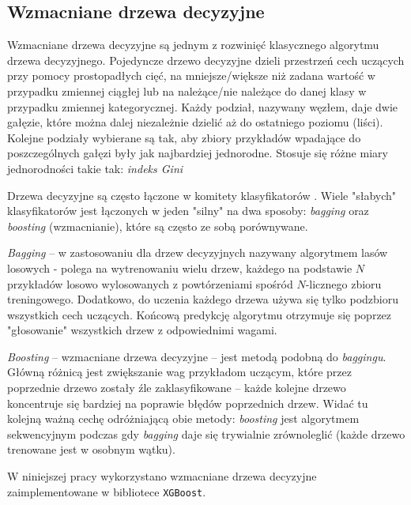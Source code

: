 \subsection{Wzmacniane drzewa decyzyjne}
\label{subsec:drzewa}

Wzmacniane drzewa decyzyjne są jednym z rozwinięć klasycznego algorytmu drzewa decyzyjnego. 
Pojedyncze drzewo decyzyjne dzieli przestrzeń cech uczących przy pomocy prostopadłych cięć, na mniejsze/większe niż zadana wartość w przypadku zmiennej ciągłej lub na należące/nie należące do danej klasy w przypadku zmiennej kategorycznej. Każdy podział, nazywany węzłem, daje dwie gałęzie, które można dalej niezależnie dzielić aż do ostatniego poziomu (liści). Kolejne podziały wybierane są tak, aby zbiory przykładów wpadające do poszczególnych gałęzi były jak najbardziej jednorodne. Stosuje się różne miary jednorodności takie tak: \textit{indeks Gini}

Drzewa decyzyjne są często łączone w komitety klasyfikatorów . Wiele "słabych" klasyfikatorów jest łączonych w jeden "silny" na dwa sposoby: \textit{bagging} oraz \textit{boosting} (wzmacnianie), które są często ze sobą porównywane.

\textit{Bagging} -- w zastosowaniu dla drzew decyzyjnych nazywany algorytmem lasów losowych  - polega na wytrenowaniu wielu drzew, każdego na podstawie $N$ przykładów losowo wylosowanych z powtórzeniami spośród $N$-licznego zbioru treningowego. Dodatkowo, do uczenia każdego drzewa używa się tylko podzbioru wszystkich cech uczących. Końcową predykcję algorytmu otrzymuje się poprzez "głosowanie" wszystkich drzew z odpowiednimi wagami.

\textit{Boosting} -- wzmacniane drzewa decyzyjne  -- jest metodą podobną do \textit{baggingu}. Główną różnicą jest zwiększanie wag przykładom uczącym, które przez poprzednie drzewo zostały źle zaklasyfikowane -- każde kolejne drzewo koncentruje się bardziej na poprawie błędów poprzednich drzew. Widać tu kolejną ważną cechę odróżniającą obie metody: \textit{boosting} jest algorytmem sekwencyjnym podczas gdy \textit{bagging} daje się trywialnie zrównoleglić (każde drzewo trenowane jest w osobnym wątku).

W niniejszej pracy wykorzystano wzmacniane drzewa decyzyjne zaimplementowane w bibliotece \texttt{XGBoost}.
